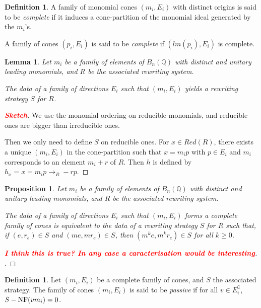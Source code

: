 \documentclass[10pt]{easychair}
\newtheorem{lemma}[theorem]{Lemma}
\newtheorem{proposition}[theorem]{Proposition}
\theoremstyle{definition}
\newtheorem{definition}[theorem]{Definition}
\newcommand\todo[1]{{\bf\textcolor{red}{#1}}}
\newcommand\Q{\mathbb{Q}}
\newcommand\Weyl[1]{B_{#1}(\Q)}
\newcommand\rewR{\to_R}
\DeclareMathOperator{\NF}{{\it S}-NF}
\begin{document}
 \begin{definition}
   A family of monomial cones $(m_i,E_i)$ with distinct origins is said
   to be \emph{complete} if it induces a cone-partition of the monomial ideal
   generated by the $m_i$'s. 

   A family of cones $(p_i,E_i)$ is said to be \emph{complete}
   if $(lm(p_i),E_i)$ is complete. 
 \end{definition}

 \begin{lemma}
   Let $m_i$ be a family of elements of $\Weyl n$ with distinct and unitary
   leading monomials, and $R$ be the associated rewriting system.
   
   The data of a family of directions $E_i$ such that $(m_i,E_i)$ yields a
   rewriting strategy $S$ for $R$.
\end{lemma}
\begin{proof}[\todo{Sketch}]
  We use the monomial ordering on reducible monomials,
  and reducible ones are bigger than irreducible ones.

  Then we only need to define $S$ on reducible ones. For $x \in Red(R)$,
  there exists a unique $(m_i,E_i)$ in the cone-partition such that $x=m_i p$
  with $p \in E_i$ and $m_i$ corresponds to an element $m_i + r$ of $R$.
  Then $h$ is defined by $h_x = x = m_ip  \rewR -rp$.
\end{proof}



 \begin{proposition}
   Let $m_i$ be a family of elements of $\Weyl n$ with distinct and unitary
   leading monomials, and $R$ be the associated rewriting system.
   
   The data of a family of directions $E_i$ such that $(m_i,E_i)$ forms a complete
   family of cones is equivalent to the data of a rewriting strategy $S$ for $R$
   such that, if $(e,r_e) \in S$ and $(me,mr_e) \in S$,
   then $(m^k e,m^k r_e) \in S$ for all $k \geq 0$.
 \end{proposition}
 \begin{proof}[\todo{I think this is true? In any case a caracterisation would be interesting}].

 \end{proof}

 
\begin{definition}
  Let $(m_i,E_i)$ be a complete family of cones, and $S$ the associated strategy.
  The family of cones $(m_i,E_i)$ is said to be \emph{passive} if for all
  $v \in E_i^\complement$, $\NF(vm_i) = 0$.
\end{definition}
\end{document}

